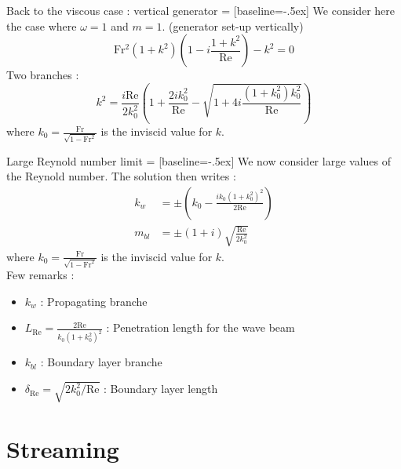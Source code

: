 \documentclass[10pt]{beamer}
\begin{document}
\begin{frame}[fragile]{Back to the viscous case : vertical generator}
   = [baseline=-.5ex]
  We consider here the case where $\omega=1$ and $m=1$. (generator set\--up vertically)
  \begin{equation*}
    \mathrm{Fr^{2}}\left(1+k^{2}\right)\left(1-i\frac{1+k^{2}}{\mathrm{Re}}\right)-k^{2}=0
  \end{equation*}
  Two branches :
  \begin{equation*}
    k^{2}=\frac{i\mathrm{Re}}{2k_{0}^{2}}\left(1+\frac{2ik_{0}^{2}}{\mathrm{Re}}-\sqrt{1+4i\frac{\left(1+k_{0}^{2}\right)k_{0}^{2}}{\mathrm{Re}}} \right)
  \end{equation*}
  where $k_{0}=\frac{\mathrm{Fr}}{\sqrt{1-\mathrm{Fr}^{2}}}$ is the inviscid value for $k$.
\end{frame}

\begin{frame}[fragile]{Large Reynold number limit}
   = [baseline=-.5ex]
  We now consider large values of the Reynold number. The solution then writes :
  \begin{align*}
    k_{w}&=\pm\left(k_{0}-\frac{ik_{0}\left(1+k_{0}^{2}\right)^{2}}{2\mathrm{Re}}\right)\\
    m_{bl}&=\pm \left(1+i\right)\sqrt{\frac{\mathrm{Re}}{2k_{0}^{2}}}
  \end{align*}
  where $k_{0}=\frac{\mathrm{Fr}}{\sqrt{1-\mathrm{Fr}^{2}}}$ is the inviscid value for $k$.\\
  Few remarks :
  \begin{itemize}
    \item $k_{w}$ : Propagating branche
    \item $L_{\mathrm{Re}}=\frac{2\mathrm{Re}}{k_{0}\left( 1+k_{0}^{2}\right)^{2}}$ : Penetration length for the wave beam
    \item $k_{bl}$ : Boundary layer branche
    \item $\delta_{\mathrm{Re}}=\sqrt{2k^{2}_{0}/\mathrm{Re}}$ : Boundary layer length
  \end{itemize}
\end{frame}

\section{Streaming}
\end{document}
